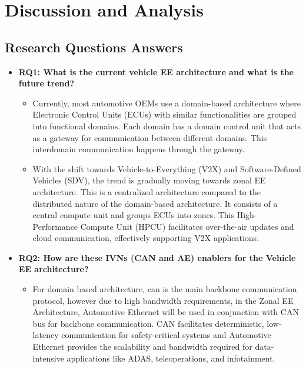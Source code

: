 \documentclass{report}
\begin{document}
\section{Discussion and Analysis}

\subsection{Research Questions Answers}
\begin{itemize}
    \item \textbf{RQ1: What is the current vehicle EE architecture and what is the future trend?}
        \begin{itemize}
            \item Currently, most automotive OEMs use a domain-based architecture where Electronic Control Units (ECUs) with similar functionalities are grouped into functional domains. Each domain has a domain control unit that acts as a gateway for communication between different domains. This interdomain communication happens through the gateway.

            \item With the shift towards Vehicle-to-Everything (V2X) and Software-Defined Vehicles (SDV), the trend is gradually moving towards zonal EE architecture. This is a centralized architecture compared to the distributed nature of the domain-based architecture. It consists of a central compute unit and groups ECUs into zones. This High-Performance Compute Unit (HPCU) facilitates over-the-air updates and cloud communication, effectively supporting V2X applications.

        \end{itemize}
        
    \item \textbf{RQ2: How are these IVNs (CAN and AE) enablers for the Vehicle EE architecture?}
        \begin{itemize}
            \item For domain based architecture, can is the main backbone communication protocol, however due to high bandwidth requirements, in the Zonal EE Architecture, Automotive Ethernet will be used in conjunction with CAN bus for backbone communication. CAN facilitates deterministic, low-latency communication for safety-critical systems and Automotive Ethernet provides the scalability and bandwidth required for data-intensive applications like ADAS, teleoperations, and infotainment.
        \end{itemize}


\end{itemize}
\end{document}
